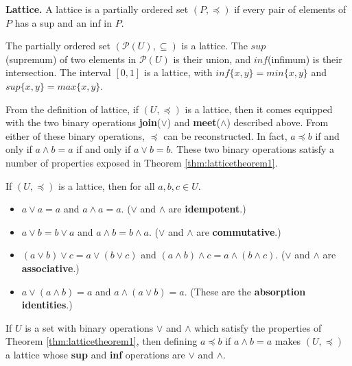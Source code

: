 \begin{defin} \textbf{Lattice.}
\label{def:Lattice}
A lattice is a partially ordered set $(P,\preceq)$ if every pair of elements of $P$ has a sup and an inf in $P$.
\end{defin}

\begin{ex}
\label{ex:Lattice}
The partially ordered set $(\mathcal{P}(U),\subseteq)$ is a lattice. The $sup$\\
(supremum) of two elements in $\mathcal{P}(U)$ is their union, and $inf$(infimum) is their intersection. The interval $[0,1]$ is a lattice, with $inf\{x,y\} = min\{x,y\}$ and $sup\{x,y\} = max\{x,y\}$. 
\end{ex}

From the definition of lattice, if $(U,\preceq)$ is a lattice, then it comes equipped with the two binary operations \textbf{join}($\vee$) and \textbf{meet}($\wedge$) described above. From either of these binary operations, $\preceq$ can be reconstructed. In fact, $a \preceq b$ if and only if $a \wedge b = a$ if and only if $a \vee b = b$. These two binary operations satisfy a number of properties exposed in Theorem \ref{thm:latticetheorem1}.

\begin{thm}
\label{thm:latticetheorem1}
If $(U,\preceq)$ is a lattice, then for all $a, b, c \in U$.
\begin{itemize}

\item $a \vee a = a$ and $a \wedge a = a$. ($\vee$ and $\wedge$ are \textbf{idempotent}.)
\item $a \vee b = b \vee a$ and $a \wedge b = b \wedge a$. ($\vee$ and $\wedge$ are \textbf{commutative}.)
\item $(a \vee b) \vee c = a \vee (b \vee c)$ and $(a \wedge b) \wedge c = a \wedge (b \wedge c)$. ($\vee$ and $\wedge$ are \textbf{associative}.)
\item $a \vee (a \wedge b) = a$ and $a \wedge (a \vee b) = a$. (These are the \textbf{absorption identities}.)
\end{itemize}
\end{thm}

\begin{thm}
\label{thm:latticetheorem2}
If $U$ is a set with binary operations $\vee$ and $\wedge$ which satisfy the properties of Theorem \ref{thm:latticetheorem1}, then defining $a \preceq b$ if $a \wedge b = a$ makes $(U,\preceq)$ a lattice whose \textbf{sup} and \textbf{inf} operations are $\vee$ and $\wedge$.
\end{thm}


